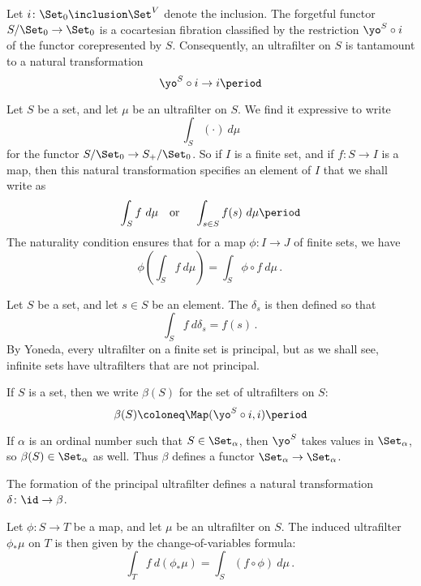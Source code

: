 \begin{nul}
	Let $ i \colon \Set_0 \inclusion \Set^V $
	denote the inclusion.
	The forgetful functor $ S/\Set_0 \to \Set_0 $
	is a cocartesian fibration classified by
	the restriction $ \yo^S \circ i $ of the functor
	corepresented by $ S $.
	Consequently, an ultrafilter on $ S $ is
	tantamount to 
	a natural transformation
	\[ \yo^S \circ i \to i \period \]
\end{nul}


\begin{notation}
	Let $ S $ be a set, and
	let $ \mu $ be an ultrafilter on $ S $.
	We find it expressive to write
	\[ \int_S (\cdot) \ d\mu \]
	for the functor $ S/\Set_0 \to S_+/\Set_0 $. 
	So if $ I $ is a finite set,
	and if $ f \colon S \to I $ is a map,
	then this natural transformation
	specifies an element of $ I $ that we shall write as
	\[
		\int_S f \ d\mu
		\text{\quad or \quad}
		\int_{s \in S} f(s) \ d\mu
		\period
	\]
	The naturality condition ensures that
	for a map $ \phi \colon I \to J $ of finite sets,
	we have
	\[
		\phi \left( \int_S f \ d\mu \right) = 
		\int_S \phi \circ f \ d\mu \period
	\]
\end{notation}

\begin{eg}
	Let $ S $ be a set, and let $ s \in S $ be an element.
	The  $ \delta_s $ is
	then defined so that
	\[ \int_S f \ d \delta_s = f(s) \period \]
	By Yoneda,
	every ultrafilter on a finite set is principal,
	but as we shall see,
	infinite sets have ultrafilters that are not principal.
\end{eg}

\begin{notation}
	If $ S $ is a set, then
	we write $ \beta(S) $ for the set
	of ultrafilters on $ S $:
	\[ \beta(S) \coloneq \Map(\yo^S \circ i, i) \period \]

	If $ \alpha $ is an ordinal number such that
	$ S \in \Set_{\alpha} $, then $ \yo^S $
	takes values in $ \Set_{\alpha} $,
	so $ \beta(S) \in \Set_{\alpha} $ as well.
	Thus $ \beta $ defines a functor
	$ \Set_{\alpha} \to \Set_{\alpha} $.

	The formation of the principal ultrafilter
	defines a natural transformation
	$ \delta \colon \id \to \beta $.
\end{notation}

\begin{nul}
	Let $ \phi \colon S \to T $ be a map,
	and let $ \mu $ be an ultrafilter on $ S $.
	The induced ultrafilter $ \phi_{\ast}\mu $ on $ T $
	is then given by the change-of-variables formula:
	\[
		\int_T f \ d (\phi_{\ast}\mu) =
		\int_S (f \circ \phi) \ d \mu \period
	\]
\end{nul}

